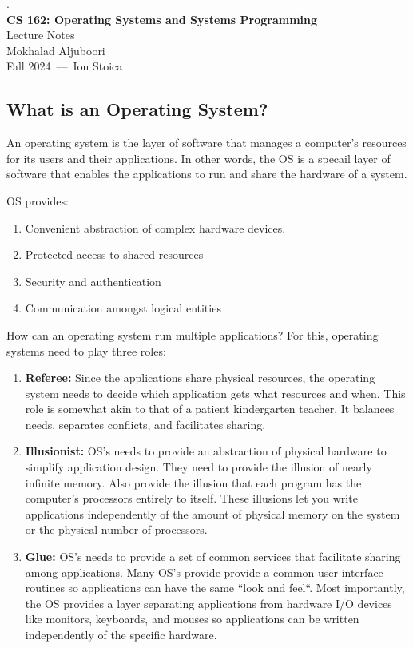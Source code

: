 \documentclass{article}
\def\class{Operating Systems and Systems Programming}
\def\semester{Fall 2024}
\def\professor{Ion Stoica}
\def\author{Mokhalad Aljuboori}
\def\title{Lecture Notes}
\def\maketitle{
    \begin{center}
        {.} \\ [1.5cm]
        {\Huge \bfseries CS 162: \class} \\[1.5cm]
        {\LARGE \title} \\[0.5cm]
        {\Large \author} \\[0.5cm]
        {\Large \semester~---~\professor} \\[0.5cm]
    \end{center}
}
\begin{document}
\maketitle
\tableofcontents

\subsection{What is an Operating System?}

An operating system is the layer of software that manages a computer's resources for its users and their applications. In other words, the OS is a specail layer of software that enables the applications to run and share the hardware of a system.

OS provides:
\begin{enumerate}
    \item Convenient abstraction of complex hardware devices.
    \item Protected access to shared resources
    \item Security and authentication
    \item Communication amongst logical entities
\end{enumerate}

How can an operating system run multiple applications? For this, operating systems need to play three roles:

\begin{enumerate}
    \item \textbf{Referee:} Since the applications share physical resources, the operating system needs to decide which application gets what resources and when. This role is somewhat akin to that of a patient kindergarten teacher. It balances needs, separates conflicts, and facilitates sharing.
    \item \textbf{Illusionist:} OS's needs to provide an abstraction of physical hardware to simplify application design. They need to provide the illusion of nearly infinite memory. Also provide the illusion that each program has the computer's processors entirely to itself. These illusions let you write applications independently of the amount of physical memory on the system or the physical number of processors.
    \item \textbf{Glue:} OS's needs to provide a set of common services that facilitate sharing among applications. Many OS's provide provide a common user interface routines so applications can have the same ``look and feel``. Most importantly, the OS provides a layer separating applications from hardware I/O devices like monitors, keyboards, and mouses so applications can be written independently of the specific hardware.
\end{enumerate}
\end{document}
